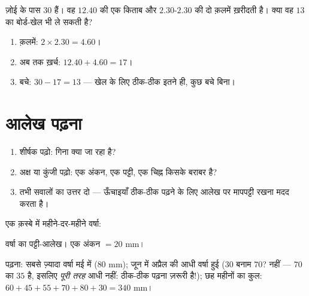 \begin{example}[बाक़ी पैसे और बजट]\label{ex:g5:data:budget}
ज़ोई के पास $30$ हैं। वह $12.40$ की एक किताब और $2.30$-$2.30$ की
दो क़लमें ख़रीदती है। क्या वह $13$ का बोर्ड-खेल भी ले सकती है?
\begin{enumerate}
  \item क़लमें: $2 \times 2.30 = 4.60$।
  \item अब तक ख़र्च: $12.40 + 4.60 = 17$।
  \item बचे: $30 - 17 = 13$ --- खेल के लिए ठीक-ठीक इतने ही,
        कुछ बचे बिना।
\end{enumerate}
\end{example}

\section{आलेख पढ़ना}

\begin{method}[कोई भी आलेख पढ़ना]\label{met:g5:data:read}
\begin{enumerate}
  \item शीर्षक पढ़ो: गिना क्या जा रहा है?
  \item अक्ष या कुंजी पढ़ो: एक अंकन, एक पट्टी, एक चिह्न किसके
        बराबर है?
  \item तभी सवालों का उत्तर दो --- ऊँचाइयाँ ठीक-ठीक पढ़ने के लिए
        आलेख पर मापपट्टी रखना मदद करता है।
\end{enumerate}
\end{method}

\begin{example}\label{ex:g5:data:chart}
एक क़स्बे में महीने-दर-महीने वर्षा:

\begin{omfigure}

{\small वर्षा का पट्टी-आलेख। एक अंकन $= 20$ mm।}
\end{omfigure}

पढ़ना: सबसे ज़्यादा वर्षा मई में ($80$ mm); जून में अप्रैल की
आधी वर्षा हुई ($30$ बनाम $70$? नहीं --- $70$ का  $35$ है,
इसलिए \emph{पूरी तरह} आधी नहीं: ठीक-ठीक पढ़ना ज़रूरी है!); छह
महीनों का कुल: $60 + 45 + 55 + 70 + 80 + 30 = 340$ mm।
\end{example}

